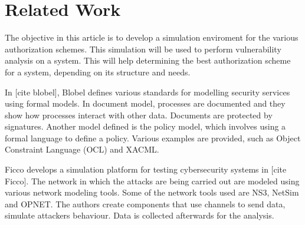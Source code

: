 \documentclass[11pt]{article} %
\begin{document}
\section{Related Work}

The objective in this article is to develop a simulation enviroment for the various authorization schemes. 
This simulation will be used to perform vulnerability analysis on a system. 
This will help determining the best authorization scheme for a system, depending on its structure and needs.

In [cite blobel], Blobel defines various standards for modelling security services using formal models. 
In document model, processes are documented and they show how processes interact with other data. 
Documents are protected by signatures. 
Another model defined is the policy model, which involves using a formal language to define a policy. 
Various examples are provided, such as Object Constraint Language (OCL) and XACML.

Ficco develops a simulation platform for testing cybersecurity systems in [cite Ficco]. 
The network in which the attacks are being carried out are modeled using various network modeling tools. 
Some of the network tools used are NS3, NetSim and OPNET. 
The authors create components that use channels to send data, simulate attackers behaviour. 
Data is collected afterwards for the analysis.
\end{document}
